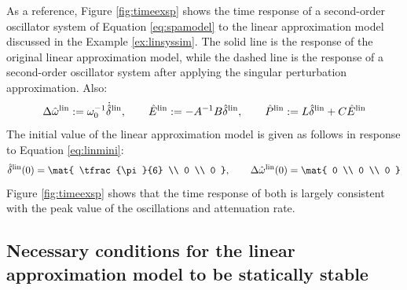 \documentclass[graybox, envcountchap]{svmult}
\begin{document}


\begin{example}
As a reference, Figure \ref{fig:timeexsp} shows the time response of a second-order oscillator system of Equation \ref{eq:spamodel} to the linear approximation model discussed in the Example \ref{ex:linsyssim}.
The solid line is the response of the original linear approximation model, while the dashed line is the response of a second-order oscillator system after applying the singular perturbation approximation.
Also:
\[
\Delta \hat{\omega}^{\rm lin}:=\omega_0^{-1} \dot{\hat{\delta}}^{\rm lin},\qquad
\hat{E}^{\rm lin}:=-A^{-1}B\hat{\delta}^{\rm lin},\qquad
\hat{P}^{\rm lin}:= L \hat{\delta}^{\rm lin} + C \hat{E}^{\rm lin}
\]
The initial value of the linear approximation model is given as follows in response to Equation \ref{eq:linmini}:
\[
\hat{\delta}^{\rm lin}(0)
 =
\mat{
\tfrac{\pi}{6} \\
0 \\
0
},\qquad
\Delta \hat{\omega}^{\rm lin}(0)
 =
\mat{
0 \\
0 \\
0
}
\]
Figure \ref{fig:timeexsp} shows that the time response of both is largely consistent with the peak value of the oscillations and attenuation rate.
\end{example}

\subsection{Necessary conditions for the linear approximation model to be statically stable\advanced}\label{sec:nesconsta}
\end{document}
